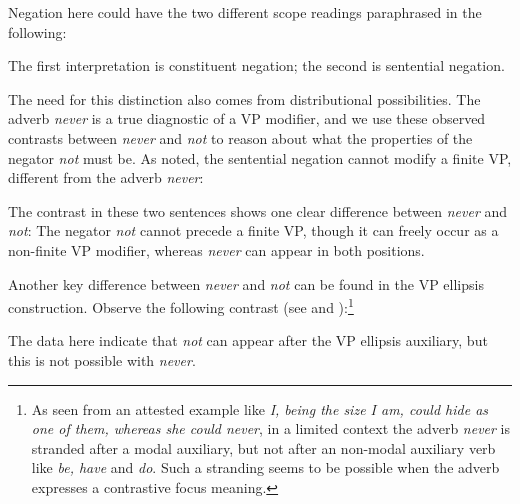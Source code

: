 \documentclass[output=paper
	        ,collection
	        ,collectionchapter
 	        ,biblatex
                ,babelshorthands
                ,newtxmath
                ,draftmode
                ,colorlinks, citecolor=brown
]{langscibook}
\begin{document}
\begin{exe}
\begin{xlist}
\begin{exe}
\begin{xlist}
\z
%
Negation here could have the two different scope readings
paraphrased in the following:


\eal
{}
\zl
%
The first interpretation is constituent negation; the second is
sentential negation.


The need for this distinction also comes from
distributional possibilities.
The adverb \textit{never} is a true
diagnostic of a VP modifier, and we use
these observed contrasts
between \textit{never} and \textit{not} to reason about what the properties of the negator \textit{not} must be. As noted, the sentential
negation  cannot modify a finite
VP, different from the adverb \textit{never}:

\eal
{}
\zl
%
The contrast in these two sentences
shows one clear difference between \textit{never}
and \textit{not}:  The negator \textit{not} cannot
precede a finite VP, though it can freely occur
as a non-finite VP modifier, whereas \textit{never} can appear in both positions.

%
%
%
%

Another key difference between \textit{never} and \textit{not} can be found in
the VP ellipsis construction.  Observe the following
contrast (see \citealt{Warner2000a-u} and \citealt{KS:02}):\footnote{As
seen from an attested example like {\it I, being the size I am, could hide as one of them, whereas she could never}, in a limited context the adverb {\it never} is stranded
after a modal auxiliary, but not after an non-modal auxiliary verb like {\it be, have}
and {\it do}. Such a stranding seems to be possible when the adverb
expresses a contrastive focus meaning.}

\eal
\label{negation-vpe-not-ex}
\zl
%
\noindent The data here indicate that \textit{not} can appear
after the VP ellipsis auxiliary, but this is not possible with
\emph{never}.
%
%


\end{xlist}
\end{exe}
\end{xlist}
\end{exe}
\end{document}

